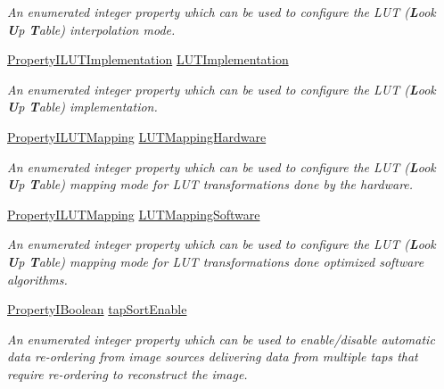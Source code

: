\begin{DoxyCompactItemize}
\begin{DoxyCompactList}\small\item\em An enumerated integer property which can be used to configure the L\+U\+T ({\bfseries L}ook {\bfseries U}p {\bfseries T}able) interpolation mode. \end{DoxyCompactList}\item 
\hyperlink{group___common_interface_ga1188a6c6d64010982c28d3bb7b60b2f7}{Property\+I\+L\+U\+T\+Implementation} \hyperlink{classmv_i_m_p_a_c_t_1_1acquire_1_1_image_processing_ab63796c1475d375fc872f0b11a102777}{L\+U\+T\+Implementation}
\begin{DoxyCompactList}\small\item\em An enumerated integer property which can be used to configure the L\+U\+T ({\bfseries L}ook {\bfseries U}p {\bfseries T}able) implementation. \end{DoxyCompactList}\item 
\hyperlink{group___common_interface_ga2641eda4be7328bd1e2af06cc136fb4b}{Property\+I\+L\+U\+T\+Mapping} \hyperlink{classmv_i_m_p_a_c_t_1_1acquire_1_1_image_processing_ac6ef8a5f6168be4ebcdfe5c0d3e2d311}{L\+U\+T\+Mapping\+Hardware}
\begin{DoxyCompactList}\small\item\em An enumerated integer property which can be used to configure the L\+U\+T ({\bfseries L}ook {\bfseries U}p {\bfseries T}able) mapping mode for L\+U\+T transformations done by the hardware. \end{DoxyCompactList}\item 
\hyperlink{group___common_interface_ga2641eda4be7328bd1e2af06cc136fb4b}{Property\+I\+L\+U\+T\+Mapping} \hyperlink{classmv_i_m_p_a_c_t_1_1acquire_1_1_image_processing_aec5f5970518b9ad4f8659fc5dba93416}{L\+U\+T\+Mapping\+Software}
\begin{DoxyCompactList}\small\item\em An enumerated integer property which can be used to configure the L\+U\+T ({\bfseries L}ook {\bfseries U}p {\bfseries T}able) mapping mode for L\+U\+T transformations done optimized software algorithms. \end{DoxyCompactList}\item 
\hyperlink{group___common_interface_ga44f9437e24b21b6c93da9039ec6786aa}{Property\+I\+Boolean} \hyperlink{classmv_i_m_p_a_c_t_1_1acquire_1_1_image_processing_a6baedffb8af8bbd02452226028af8ce7}{tap\+Sort\+Enable}
\begin{DoxyCompactList}\small\item\em An enumerated integer property which can be used to enable/disable automatic data re-\/ordering from image sources delivering data from multiple taps that require re-\/ordering to reconstruct the image. \end{DoxyCompactList}\item 

\end{DoxyCompactItemize}
